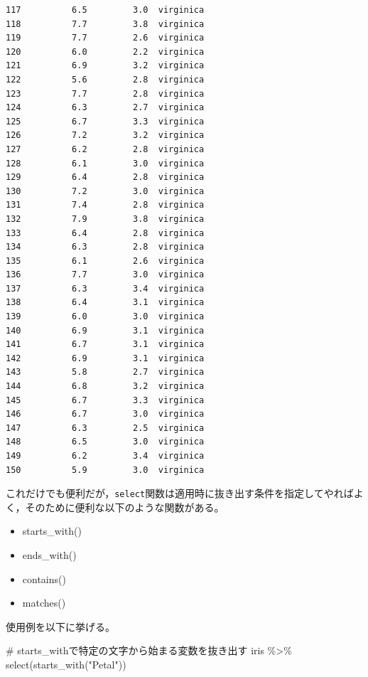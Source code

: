 \documentclass[
  a4paper,
]{ltjsbook}
\newenvironment{Shaded}{\begin{snugshade}}{\end{snugshade}}
\newcommand{\CommentTok}[1]{\textcolor[rgb]{0.37,0.37,0.37}{#1}}
\newcommand{\FunctionTok}[1]{\textcolor[rgb]{0.28,0.35,0.67}{#1}}
\newcommand{\NormalTok}[1]{\textcolor[rgb]{0.00,0.23,0.31}{#1}}
\newcommand{\SpecialCharTok}[1]{\textcolor[rgb]{0.37,0.37,0.37}{#1}}
\newcommand{\StringTok}[1]{\textcolor[rgb]{0.13,0.47,0.30}{#1}}
\providecommand{\tightlist}{%
  \setlength{\itemsep}{0pt}\setlength{\parskip}{0pt}}\usepackage{longtable,booktabs,array}
\begin{document}
\begin{verbatim}
117          6.5         3.0  virginica
118          7.7         3.8  virginica
119          7.7         2.6  virginica
120          6.0         2.2  virginica
121          6.9         3.2  virginica
122          5.6         2.8  virginica
123          7.7         2.8  virginica
124          6.3         2.7  virginica
125          6.7         3.3  virginica
126          7.2         3.2  virginica
127          6.2         2.8  virginica
128          6.1         3.0  virginica
129          6.4         2.8  virginica
130          7.2         3.0  virginica
131          7.4         2.8  virginica
132          7.9         3.8  virginica
133          6.4         2.8  virginica
134          6.3         2.8  virginica
135          6.1         2.6  virginica
136          7.7         3.0  virginica
137          6.3         3.4  virginica
138          6.4         3.1  virginica
139          6.0         3.0  virginica
140          6.9         3.1  virginica
141          6.7         3.1  virginica
142          6.9         3.1  virginica
143          5.8         2.7  virginica
144          6.8         3.2  virginica
145          6.7         3.3  virginica
146          6.7         3.0  virginica
147          6.3         2.5  virginica
148          6.5         3.0  virginica
149          6.2         3.4  virginica
150          5.9         3.0  virginica
\end{verbatim}

これだけでも便利だが，\texttt{select}関数は適用時に抜き出す条件を指定してやればよく，そのために便利な以下のような関数がある。

\begin{itemize}
\tightlist
\item
  starts\_with()
\item
  ends\_with()
\item
  contains()
\item
  matches()
\end{itemize}

使用例を以下に挙げる。

\begin{Shaded}
\begin{Highlighting}[]
\CommentTok{\# starts\_withで特定の文字から始まる変数を抜き出す}
\NormalTok{iris }\SpecialCharTok{\%\textgreater{}\%} \FunctionTok{select}\NormalTok{(}\FunctionTok{starts\_with}\NormalTok{(}\StringTok{"Petal"}\NormalTok{))}
\end{Highlighting}
\end{Shaded}
\end{document}
